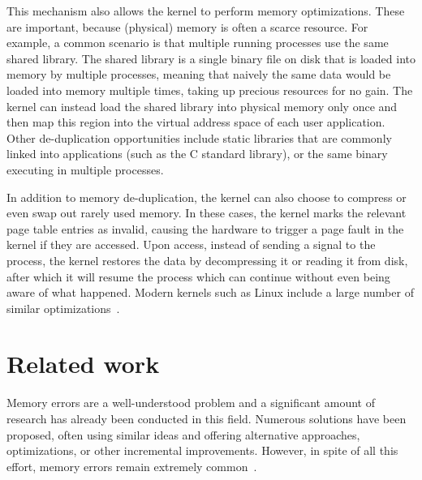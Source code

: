 This mechanism also allows the kernel to perform memory optimizations. These are important, because (physical) memory is often a scarce resource. For example, a common scenario is that multiple running processes use the same shared library. The shared library is a single binary file on disk that is loaded into memory by multiple processes, meaning that naively the same data would be loaded into memory multiple times, taking up precious resources for no gain. The kernel can instead load the shared library into physical memory only once and then map this region into the virtual address space of each user application. Other de-duplication opportunities include static libraries that are commonly linked into applications (such as the C standard library), or the same binary executing in multiple processes.

In addition to memory de-duplication, the kernel can also choose to compress or even swap out rarely used memory. In these cases, the kernel marks the relevant page table entries as invalid, causing the hardware to trigger a page fault in the kernel if they are accessed. Upon access, instead of sending a signal to the process, the kernel restores the data by decompressing it or reading it from disk, after which it will resume the process which can continue without even being aware of what happened. Modern kernels such as Linux include a large number of similar optimizations~\cite{linux-kernel-mm}.


\section{Related work}
\label{sec:related-work}

Memory errors are a well-understood problem and a significant amount of research has already been conducted in this field. Numerous solutions have been proposed, often using similar ideas and offering alternative approaches, optimizations, or other incremental improvements. However, in spite of all this effort, memory errors remain extremely common~\cite{memerrors-past-present-future}.

